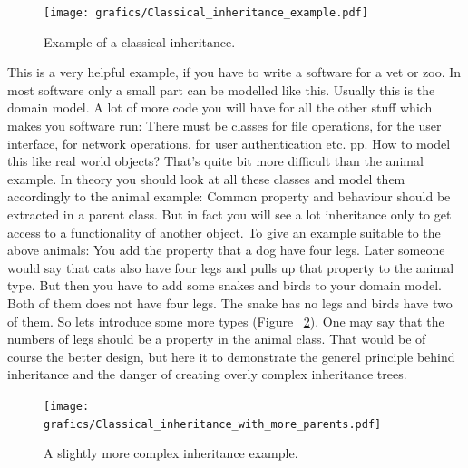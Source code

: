 \documentclass[11pt, a4paper]{report}
\begin{document}
\begin{figure}[ht]
    \centering
    \texttt{[image: grafics/Classical\_inheritance\_example.pdf]}
    \caption{Example of a classical inheritance.}
    \label{fig:Classical_inheritance_example}
\end{figure}

This is a very helpful example, if you have to write a software for a vet or zoo. In most software only a small part can be modelled like this. Usually this is the domain model. A lot of more code you will have for all the other stuff which makes you software run: There must be classes for file operations, for the user interface, for network operations, for user authentication etc. pp. How to model this like real world objects? That's quite bit more difficult than the animal example. In theory you should look at all these classes and model them accordingly to the animal example: Common property and behaviour should be extracted in a parent class. But in fact you will see a lot inheritance only to get access to a functionality of another object. To give an example suitable to the above animals: You add the property that a dog have four legs. Later someone would say that cats also have four legs and pulls up that property to the animal type. But then you have to add some snakes and birds to your domain model. Both of them does not have four legs. The snake has no legs and birds have two of them. So lets introduce some more types (Figure ~\ref{fig:Classical_inheritance_with_more_parents}). One may say that the numbers of legs should be a property in the animal class. That would be of course the better design, but here it to demonstrate the generel principle behind inheritance and the danger of creating overly complex inheritance trees. 

\begin{figure}[ht]
    \centering
    \texttt{[image: grafics/Classical\_inheritance\_with\_more\_parents.pdf]}
    \caption{A slightly more complex inheritance example.}
    \label{fig:Classical_inheritance_with_more_parents}
\end{figure}
\end{document}
